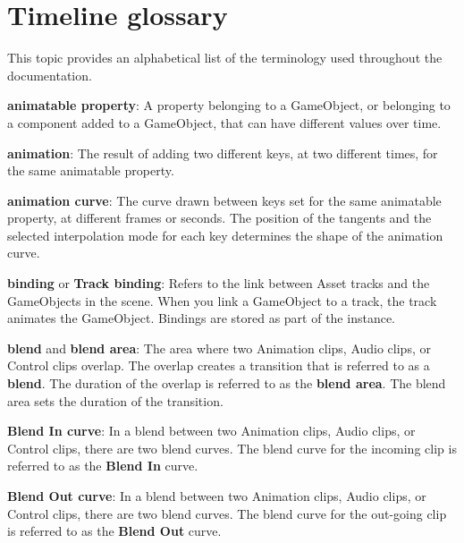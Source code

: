 \chapter{Timeline glossary}
\hypertarget{md__hey_tea_9_2_library_2_package_cache_2com_8unity_8timeline_0d1_87_85_2_documentation_0i_2tl__gloss}{}\label{md__hey_tea_9_2_library_2_package_cache_2com_8unity_8timeline_0d1_87_85_2_documentation_0i_2tl__gloss}
\label{md__hey_tea_9_2_library_2_package_cache_2com_8unity_8timeline_0d1_87_85_2_documentation_0i_2tl__gloss_autotoc_md4736}%
%
 This topic provides an alphabetical list of the terminology used throughout the  documentation.

{\bfseries{animatable property}}\+: A property belonging to a Game\+Object, or belonging to a component added to a Game\+Object, that can have different values over time.

{\bfseries{animation}}\+: The result of adding two different keys, at two different times, for the same animatable property.

{\bfseries{animation curve}}\+: The curve drawn between keys set for the same animatable property, at different frames or seconds. The position of the tangents and the selected interpolation mode for each key determines the shape of the animation curve.

{\bfseries{binding}} or {\bfseries{Track binding}}\+: Refers to the link between  Asset tracks and the Game\+Objects in the scene. When you link a Game\+Object to a track, the track animates the Game\+Object. Bindings are stored as part of the  instance.

{\bfseries{blend}} and {\bfseries{blend area}}\+: The area where two Animation clips, Audio clips, or Control clips overlap. The overlap creates a transition that is referred to as a {\bfseries{blend}}. The duration of the overlap is referred to as the {\bfseries{blend area}}. The blend area sets the duration of the transition.

{\bfseries{Blend In curve}}\+: In a blend between two Animation clips, Audio clips, or Control clips, there are two blend curves. The blend curve for the incoming clip is referred to as the {\bfseries{Blend In}} curve.

{\bfseries{Blend Out curve}}\+: In a blend between two Animation clips, Audio clips, or Control clips, there are two blend curves. The blend curve for the out-\/going clip is referred to as the {\bfseries{Blend Out}} curve.

